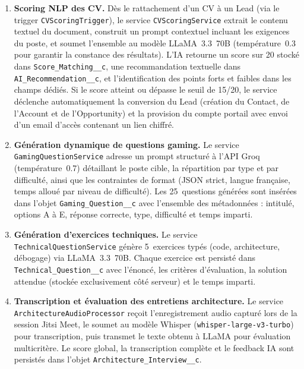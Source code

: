 \begin{enumerate}[label=\textbf{EF-IA\arabic*}]
    \item \textbf{Scoring NLP des CV.} Dès le rattachement d'un CV à un Lead (via le trigger \texttt{CVScoringTrigger}), le service \texttt{CVScoringService} extrait le contenu textuel du document, construit un prompt contextuel incluant les exigences du poste, et soumet l'ensemble au modèle LLaMA~3.3~70B (température~0.3 pour garantir la constance des résultats). L'IA retourne un score sur 20 stocké dans \texttt{Score\_Matching\_\_c}, une recommandation textuelle dans \texttt{AI\_Recommendation\_\_c}, et l'identification des points forts et faibles dans les champs dédiés. Si le score atteint ou dépasse le seuil de 15/20, le service déclenche automatiquement la conversion du Lead (création du Contact, de l'Account et de l'Opportunity) et la provision du compte portail avec envoi d'un email d'accès contenant un lien chiffré.
    
    \item \textbf{Génération dynamique de questions gaming.} Le service \texttt{GamingQuestionService} adresse un prompt structuré à l'API Groq (température~0.7) détaillant le poste cible, la répartition par type et par difficulté, ainsi que les contraintes de format (JSON strict, langue française, temps alloué par niveau de difficulté). Les 25~questions générées sont insérées dans l'objet \texttt{Gaming\_Question\_\_c} avec l'ensemble des métadonnées : intitulé, options A à E, réponse correcte, type, difficulté et temps imparti.
    
    \item \textbf{Génération d'exercices techniques.} Le service \texttt{TechnicalQuestionService} génère 5~exercices typés (code, architecture, débogage) via LLaMA~3.3~70B. Chaque exercice est persisté dans \texttt{Technical\_Question\_\_c} avec l'énoncé, les critères d'évaluation, la solution attendue (stockée exclusivement côté serveur) et le temps imparti.
    
    \item \textbf{Transcription et évaluation des entretiens architecture.} Le service \texttt{ArchitectureAudioProcessor} reçoit l'enregistrement audio capturé lors de la session Jitsi Meet, le soumet au modèle Whisper (\texttt{whisper-large-v3-turbo}) pour transcription, puis transmet le texte obtenu à LLaMA pour évaluation multicritère. Le score global, la transcription complète et le feedback IA sont persistés dans l'objet \texttt{Architecture\_Interview\_\_c}.
\end{enumerate}


